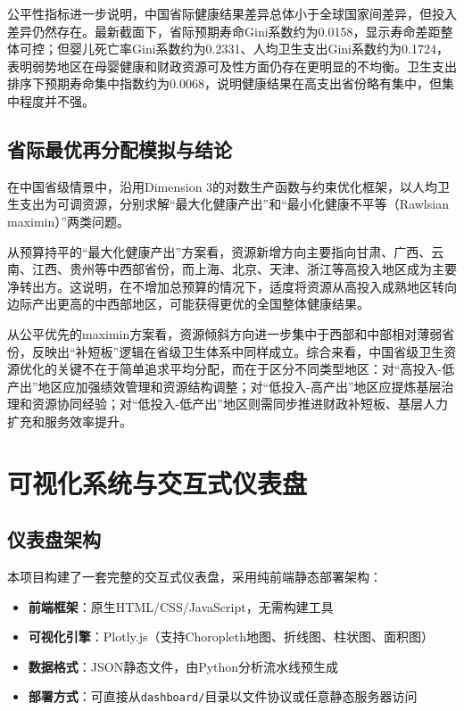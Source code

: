\documentclass[12pt,a4paper]{ctexart}
\begin{document}
公平性指标进一步说明，中国省际健康结果差异总体小于全球国家间差异，但投入差异仍然存在。最新截面下，省际预期寿命Gini系数约为0.0158，显示寿命差距整体可控；但婴儿死亡率Gini系数约为0.2331、人均卫生支出Gini系数约为0.1724，表明弱势地区在母婴健康和财政资源可及性方面仍存在更明显的不均衡。卫生支出排序下预期寿命集中指数约为0.0068，说明健康结果在高支出省份略有集中，但集中程度并不强。

\subsection{省际最优再分配模拟与结论}

在中国省级情景中，沿用Dimension 3的对数生产函数与约束优化框架，以人均卫生支出为可调资源，分别求解“最大化健康产出”和“最小化健康不平等（Rawlsian maximin）”两类问题。

从预算持平的“最大化健康产出”方案看，资源新增方向主要指向甘肃、广西、云南、江西、贵州等中西部省份，而上海、北京、天津、浙江等高投入地区成为主要净转出方。这说明，在不增加总预算的情况下，适度将资源从高投入成熟地区转向边际产出更高的中西部地区，可能获得更优的全国整体健康结果。

从公平优先的maximin方案看，资源倾斜方向进一步集中于西部和中部相对薄弱省份，反映出“补短板”逻辑在省级卫生体系中同样成立。综合来看，中国省级卫生资源优化的关键不在于简单追求平均分配，而在于区分不同类型地区：对“高投入-低产出”地区应加强绩效管理和资源结构调整；对“低投入-高产出”地区应提炼基层治理和资源协同经验；对“低投入-低产出”地区则需同步推进财政补短板、基层人力扩充和服务效率提升。

\section{可视化系统与交互式仪表盘}

\subsection{仪表盘架构}

本项目构建了一套完整的交互式仪表盘，采用纯前端静态部署架构：

\begin{itemize}[leftmargin=1.5em]
    \item \textbf{前端框架}：原生HTML/CSS/JavaScript，无需构建工具
    \item \textbf{可视化引擎}：Plotly.js（支持Choropleth地图、折线图、柱状图、面积图）
    \item \textbf{数据格式}：JSON静态文件，由Python分析流水线预生成
    \item \textbf{部署方式}：可直接从\texttt{dashboard/}目录以文件协议或任意静态服务器访问
\end{itemize}
\end{document}
